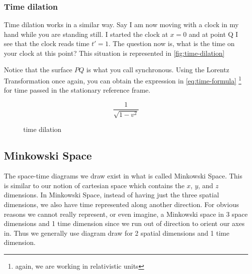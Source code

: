 \documentclass[16pt]{scrartcl}
\numberwithin{equation}{section}
\theoremstyle{plain}
\theoremstyle{definition}
\begin{document}
\subsubsection*{Time dilation}

Time dilation works in a similar way. Say I am now moving with a clock in my hand while you are standing still. I started the clock at $x=0$ and at point Q I see that the clock reads time $t'=1$. The question now is, what is the time on your clock at this point? This situation is represented in \autoref{fig:time-dilation}

Notice that the surface $PQ$ is what you call synchronous. Using the Lorentz Transformation once again, you can obtain the expression in \autoref{eq:time-formula} \footnote{again, we are working in relativistic units} for time passed in the stationary reference frame.

\begin{equation}
    \frac{1}{\sqrt{1-v^2}}
    \label{eq:time-formula}
\end{equation}


\begin{figure}
    \centering
    \caption{time dilation}
    \label{fig:time-dilation}
\end{figure}

\subsection{Minkowski Space}

The space-time diagrams we draw exist in what is called Minkowski Space. This is similar to our notion of cartesian space which contains the $x$, $y$, and $z$ dimensions. In Minkowski Space, instead of having just the three spatial dimensions, we also have time represented along another direction. For obvious reasons we cannot really represent, or even imagine, a Minkowski space in 3 space dimensions and 1 time dimension since we run out of direction to orient our axes in. Thus we generally use diagram draw for 2 spatial dimensions and 1 time dimension. 
\end{document}
